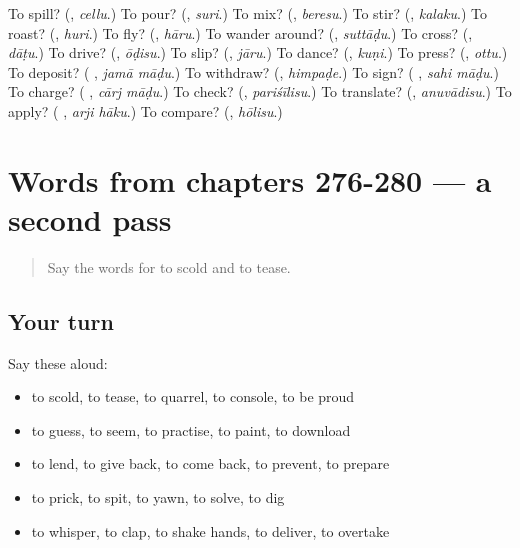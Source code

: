 \begin{tcolorbox}[breakable,colback=teal!4,colframe=teal!35!black,title={Before you move on}]
To spill? (\textbf{}, \emph{cellu}.) To pour? (\textbf{}, \emph{suri}.) To mix? (\textbf{}, \emph{beresu}.) To stir? (\textbf{}, \emph{kalaku}.) To roast? (\textbf{}, \emph{huri}.) To fly? (\textbf{}, \emph{hāru}.) To wander around? (\textbf{}, \emph{suttāḍu}.) To cross? (\textbf{}, \emph{dāṭu}.) To drive? (\textbf{}, \emph{ōḍisu}.) To slip? (\textbf{}, \emph{jāru}.) To dance? (\textbf{}, \emph{kuṇi}.) To press? (\textbf{}, \emph{ottu}.) To deposit? (\textbf{ }, \emph{jamā māḍu}.) To withdraw? (\textbf{}, \emph{himpaḍe}.) To sign? (\textbf{ }, \emph{sahi māḍu}.) To charge? (\textbf{ }, \emph{cārj māḍu}.) To check? (\textbf{}, \emph{pariśīlisu}.) To translate? (\textbf{}, \emph{anuvādisu}.) To apply? (\textbf{ }, \emph{arji hāku}.) To compare? (\textbf{}, \emph{hōlisu}.)
\end{tcolorbox}
\section[(dialogue)]{Words from chapters 276-280 — a second pass}

\label{lesson:KA-R280-second-pass-words-from-chapters-276-280}



\begin{quote}
Say the words for to scold and to tease.
\end{quote}

\subsection*{Your turn}
Say these aloud:

\begin{itemize}
\raggedright
  \item to scold, to tease, to quarrel, to console, to be proud
  \item to guess, to seem, to practise, to paint, to download
  \item to lend, to give back, to come back, to prevent, to prepare
  \item to prick, to spit, to yawn, to solve, to dig
  \item to whisper, to clap, to shake hands, to deliver, to overtake
\end{itemize}

